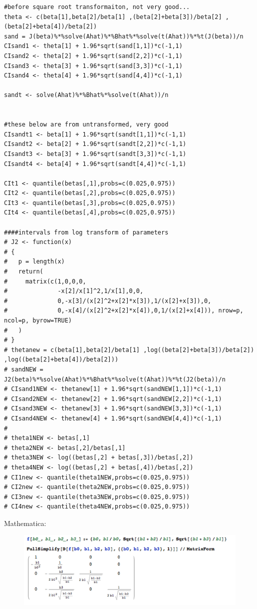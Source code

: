\documentclass[11pt]{article}
\begin{document}
\begin{verbatim}
#before square root transformaiton, not very good...
theta <- c(beta[1],beta[2]/beta[1] ,(beta[2]+beta[3])/beta[2] ,(beta[2]+beta[4])/beta[2])
sand = J(beta)%*%solve(Ahat)%*%Bhat%*%solve(t(Ahat))%*%t(J(beta))/n
CIsand1 <- theta[1] + 1.96*sqrt(sand[1,1])*c(-1,1)
CIsand2 <- theta[2] + 1.96*sqrt(sand[2,2])*c(-1,1)
CIsand3 <- theta[3] + 1.96*sqrt(sand[3,3])*c(-1,1)
CIsand4 <- theta[4] + 1.96*sqrt(sand[4,4])*c(-1,1)

sandt <- solve(Ahat)%*%Bhat%*%solve(t(Ahat))/n


#these below are from untransformed, very good
CIsandt1 <- beta[1] + 1.96*sqrt(sandt[1,1])*c(-1,1)
CIsandt2 <- beta[2] + 1.96*sqrt(sandt[2,2])*c(-1,1)
CIsandt3 <- beta[3] + 1.96*sqrt(sandt[3,3])*c(-1,1)
CIsandt4 <- beta[4] + 1.96*sqrt(sandt[4,4])*c(-1,1)

CIt1 <- quantile(betas[,1],probs=c(0.025,0.975))
CIt2 <- quantile(betas[,2],probs=c(0.025,0.975))
CIt3 <- quantile(betas[,3],probs=c(0.025,0.975))
CIt4 <- quantile(betas[,4],probs=c(0.025,0.975))

####intervals from log transform of parameters
# J2 <- function(x)
# {
#   p = length(x)
#   return(
#     matrix(c(1,0,0,0,
#              -x[2]/x[1]^2,1/x[1],0,0,
#              0,-x[3]/(x[2]^2+x[2]*x[3]),1/(x[2]+x[3]),0,
#              0,-x[4]/(x[2]^2+x[2]*x[4]),0,1/(x[2]+x[4])), nrow=p, ncol=p, byrow=TRUE)
#   )
# }
# thetanew = c(beta[1],beta[2]/beta[1] ,log((beta[2]+beta[3])/beta[2]) ,log((beta[2]+beta[4])/beta[2]))
# sandNEW = J2(beta)%*%solve(Ahat)%*%Bhat%*%solve(t(Ahat))%*%t(J2(beta))/n
# CIsand1NEW <- thetanew[1] + 1.96*sqrt(sandNEW[1,1])*c(-1,1)
# CIsand2NEW <- thetanew[2] + 1.96*sqrt(sandNEW[2,2])*c(-1,1)
# CIsand3NEW <- thetanew[3] + 1.96*sqrt(sandNEW[3,3])*c(-1,1)
# CIsand4NEW <- thetanew[4] + 1.96*sqrt(sandNEW[4,4])*c(-1,1)
# 
# theta1NEW <- betas[,1]
# theta2NEW <- betas[,2]/betas[,1]
# theta3NEW <- log((betas[,2] + betas[,3])/betas[,2])
# theta4NEW <- log((betas[,2] + betas[,4])/betas[,2])
# CI1new <- quantile(theta1NEW,probs=c(0.025,0.975))
# CI2new <- quantile(theta2NEW,probs=c(0.025,0.975))
# CI3new <- quantile(theta3NEW,probs=c(0.025,0.975))
# CI4new <- quantile(theta4NEW,probs=c(0.025,0.975))
\end{verbatim}
Mathematica:
\begin{figure}[H]\includegraphics[scale=0.5]{hw2.png}
\end{figure}
\end{document}

